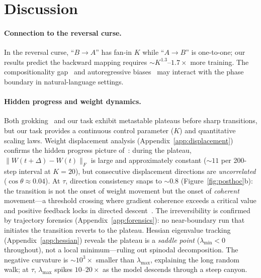 \documentclass{article}
\begin{document}
\vspace{-3pt}
\section{Discussion}
\label{sec:discussion}
\vspace{-2pt}

\paragraph{Connection to the reversal curse.}
In the reversal curse, ``$B \to A$'' has fan-in $K$ while ``$A \to B$'' is one-to-one; our results predict the backward mapping requires ${\sim}K^{1.3}$--$1.7\times$ more training.
The compositionality gap~\citep{press2023measuring} and autoregressive biases~\citep{mccoy2023embers} may interact with the phase boundary in natural-language settings.

\paragraph{Hidden progress and weight dynamics.}
Both grokking~\citep{power2022grokking, nanda2023progress} and our task exhibit metastable plateaus before sharp transitions, but our task provides a continuous control parameter ($K$) and quantitative scaling laws.
Weight displacement analysis (Appendix~\ref{app:displacement}) confirms the hidden progress picture of~\citet{barak2022hidden}: during the plateau, $\|W(t{+}\Delta) - W(t)\|_F$ is large and approximately constant (${\sim}11$ per 200-step interval at $K{=}20$), but consecutive displacement directions are \emph{uncorrelated} ($\cos\theta \approx 0.04$).
At $\tau$, direction consistency snaps to ${\sim}0.8$ (Figure~\ref{fig:posthoc}b): the transition is not the onset of weight movement but the onset of \emph{coherent} movement---a threshold crossing where gradient coherence exceeds a critical value and positive feedback locks in directed descent~\citep{chen2024hidden}.
The irreversibility is confirmed by trajectory forensics (Appendix~\ref{app:forensics}): no near-boundary run that initiates the transition reverts to the plateau.
Hessian eigenvalue tracking (Appendix~\ref{app:hessian}) reveals the plateau is a \emph{saddle point} ($\lambda_\text{min} < 0$ throughout), not a local minimum---ruling out spinodal decomposition.
The negative curvature is ${\sim}10^3{\times}$ smaller than $\lambda_\text{max}$, explaining the long random walk; at $\tau$, $\lambda_\text{max}$ spikes $10$--$20{\times}$ as the model descends through a steep canyon.
\end{document}
